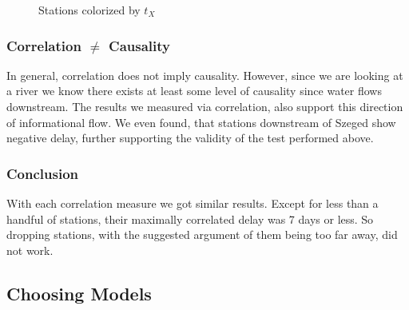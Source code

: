 \documentclass{article}
\begin{document}
\begin{figure}[h]

  \centering
  \caption{Stations colorized by $t_X$}
  \label{fig:7}
\end{figure}


\subsubsection{Correlation $\neq$ Causality}

In general, correlation does not imply causality. However, since we are
looking at a river we know there exists at least some level of causality since
water flows downstream. The results we measured via correlation, also support
this direction of informational flow. We even found, that stations downstream
of Szeged show negative delay, further supporting the validity of the test
performed above.

\subsubsection{Conclusion}

With each correlation measure we got similar results. Except for less than a
handful of stations, their maximally correlated delay was 7 days or less. So
dropping stations, with the suggested argument of them being too far away, did
not work.

\subsection{Choosing Models}
\end{document}
